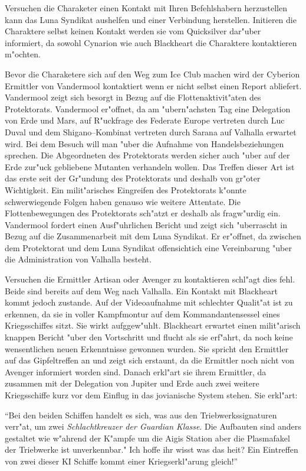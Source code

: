 Versuchen die Charaketer einen Kontakt mit Ihren Befehlshabern herzustellen kann das Luna Syndikat aushelfen und einer Verbindung herstellen. Initieren die Charaktere selbst keinen Kontakt werden sie vom Quicksilver dar"uber informiert, da\3 sowohl Cynarion wie auch Blackheart die Charaktere kontaktieren m"ochten.

Bevor die Charaketere sich auf den Weg zum Ice Club machen wird der Cyberion Ermittler von Vandermool kontaktiert wenn er nicht selbst einen Report abliefert. Vandermool zeigt sich besorgt in Bezug auf die Flottenaktivit"aten des Protektorats. Vandermool er"offnet, da\3 am "ubern"achsten Tag eine Delegation von Erde und Mars, auf R"uckfrage des Federate Europe vertreten durch Luc Duval und dem Shigano--Kombinat vertreten durch Sarana auf Valhalla erwartet wird. Bei dem Besuch will man "uber die Aufnahme von Handelsbeziehungen sprechen. Die Abgeordneten des Protektorats werden sicher auch "uber auf der Erde zur"uck gebliebene Mutanten verhandeln wollen. Das Treffen dieser Art ist das erste seit der Gr"undung des Protektorats und deshalb von gr"o\3ter Wichtigkeit. Ein milit"arisches Eingreifen des Protektorats k"onnte schwerwiegende Folgen haben genauso wie weitere Attentate. Die Flottenbewegungen des Protektorats sch"atzt er deshalb als fragw"urdig ein. Vandermool fordert einen Ausf"uhrlichen Bericht und zeigt sich "uberrascht in Bezug auf die Zusammenarbeit mit dem Luna Syndikat. Er er"offnet, da\3 zwischen dem Protektorat und dem Luna Syndikat offensichtich eine Vereinbarung "uber die Administration von Valhalla besteht.

Versuchen die Ermittler Artisan oder Avenger zu kontaktieren schl"agt dies fehl. Beide sind bereits auf dem Weg nach Valhalla. Ein Kontakt mit Blackheart kommt jedoch zustande. Auf der Videoaufnahme mit schlechter Qualit"at ist zu erkennen, da\3 sie in voller Kampfmontur auf dem Kommandantensessel eines Kriegsschiffes sitzt. Sie wirkt aufggew"uhlt. Blackheart erwartet einen milit"arisch knappen Bericht "uber den Vortschritt und flucht als sie erf"ahrt, da\3 noch keine wensentlichen neuen Erkenntnisse gewonnen wurden. Sie spricht den Ermittler auf das Gipfeltreffen an und zeigt sich erstaunt, da\3 die Ermittler noch nicht von Avenger informiert worden sind. Danach erkl"art sie ihrem Ermittler, da\3 zusammen mit der Delegation von Jupiter und Erde auch zwei weitere Kriegsschiffe kurz vor dem Einflug in das jovianische System stehen. Sie erkl"art:

"`Bei den beiden Schiffen handelt es sich, was aus den Triebwerkssignaturen verr"at, um zwei \emph{Schlachtkreuzer der Guardian Klasse}. Die Aufbauten sind anders gestaltet wie w"ahrend der K"ampfe um die Aigis Station aber die Plasmafakel der Triebwerke ist unverkennbar." Ich hoffe ihr wisst was das hei\3t? Ein Eintreffen von zwei dieser KI Schiffe kommt einer Kriegserkl"arung gleich!"' 

